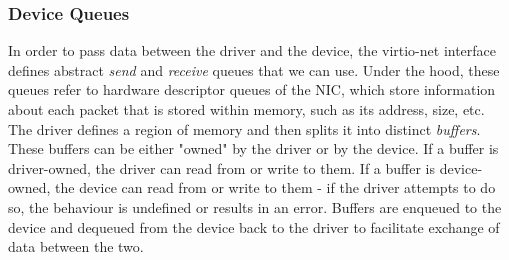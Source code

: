 \subsubsection{Device Queues}
In order to pass data between the driver and the device, the virtio-net interface defines abstract \textit{send} and \textit{receive} queues that we can use. Under the hood, these queues refer to hardware descriptor queues of the NIC, which store information about each packet that is stored within memory, such as its address, size, etc. The driver defines a region of memory and then splits it into distinct \textit{buffers}. These buffers can be either "owned" by the driver or by the device. If a buffer is driver-owned, the driver can read from or write to them. If a buffer is device-owned, the device can read from or write to them - if the driver attempts to do so, the behaviour is undefined or results in an error. Buffers are enqueued to the device and dequeued from the device back to the driver to facilitate exchange of data between the two.

